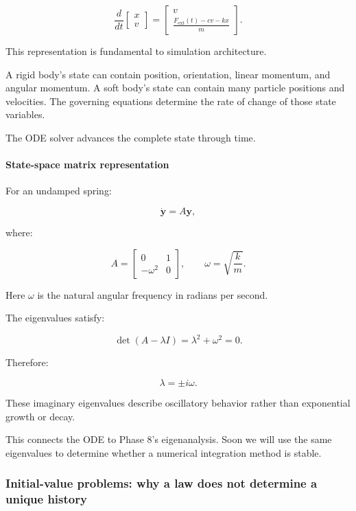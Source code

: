\[
\boxed{ \frac{d}{dt} \begin{bmatrix} x\\v \end{bmatrix} = \begin{bmatrix} v\\ \frac{F_{\mathrm{ext}}(t)-cv-kx}{m} \end{bmatrix} }.
\]

This representation is fundamental to simulation architecture.

A rigid body's state can contain position, orientation, linear momentum, and angular momentum. A soft body's state can contain many particle positions and velocities. The governing equations determine the rate of change of those state variables.

The ODE solver advances the complete state through time.

\paragraph{State-space matrix representation}\label{02-foundations-ii-ch022-state-space-matrix-representation}

\hypertarget{02-foundations-ii-ch022-state-space-matrix-representation}{}

For an undamped spring:

\[
\dot{\mathbf y}=A\mathbf y,
\]

where:

\[
\boxed{ A= \begin{bmatrix} 0&1\\ -\omega^2&0 \end{bmatrix}, \qquad \omega=\sqrt{\frac{k}{m}} }.
\]

Here \(\omega\) is the natural angular frequency in radians per second.

The eigenvalues satisfy:

\[
\det(A-\lambda I) = \lambda^2+\omega^2=0.
\]

Therefore:

\[
\lambda=\pm i\omega.
\]

These imaginary eigenvalues describe oscillatory behavior rather than exponential growth or decay.

This connects the ODE to Phase 8's eigenanalysis. Soon we will use the same eigenvalues to determine whether a numerical integration method is stable.

\subsubsection{Initial-value problems: why a law does not determine a unique history}\label{02-foundations-ii-ch022-initial-value-problems-why-a-law-does-not-determine-a-unique-history}

